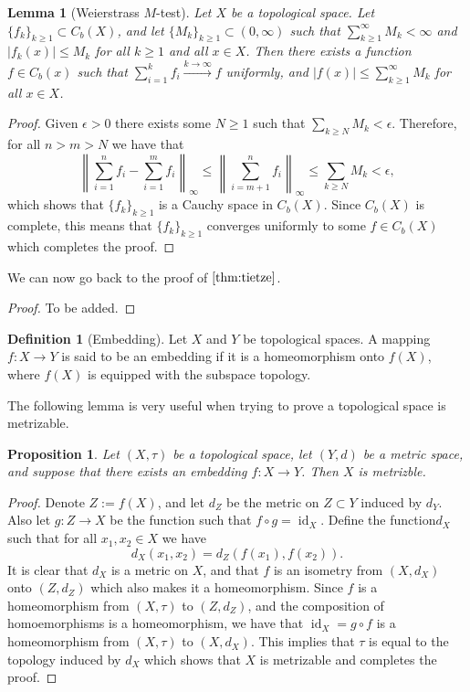 \documentclass[11pt,a4paper]{article}
\theoremstyle{definition}
\newtheorem{definition}{Definition}[section]
\theoremstyle{plain}
\newtheorem{proposition}[theorem]{Proposition}
\newtheorem{lemma}[theorem]{Lemma}
\DeclareMathOperator{\id}{id}
\newcommand{\abs}[1]{\left\lvert #1\right\rvert}
\newcommand{\norm}[1]{\left\lVert #1\right\rVert}
\begin{document}
  \begin{lemma}[Weierstrass $M$-test]\label{lem:m-test}
    Let $X$ be a topological space. Let $\{f_k\}_{k \geq 1} \subset C_b(X)$,
    and let $\{M_k\}_{k \geq 1} \subset (0,\infty)$ such that
    $\sum_{k \geq 1}^{\infty} M_k < \infty$ and
    $\abs{f_k(x)} \le M_k$ for all $k \geq 1$ and all $x \in X$.
    Then there exists a function $f \in C_b(x)$ such that
    $\sum_{i=1}^{k} f_i \xrightarrow{k \to \infty} f$ uniformly, and
    $\abs{f(x)} \le \sum_{k \geq 1}^{\infty} M_k$ for all $x \in X$.
  \end{lemma}
  \begin{proof}
    Given $\epsilon > 0$ there exists some $N \geq 1$ such that
    $\sum_{k \geq N} M_k < \epsilon$. Therefore, for all $n > m > N$
    we have that
    \[
      \norm{\sum_{i=1}^{n} f_i - \sum_{i=1}^{m} f_i}_{\infty} \le
      \norm{\sum_{i=m+1}^{n} f_i}_{\infty} \le
      \sum_{k \geq N} M_k <
      \epsilon,
    \]
    which shows that $\{f_k\}_{k \geq 1}$ is a Cauchy space in $C_b(X)$.
    Since $C_b(X)$ is complete, this means that $\{f_k\}_{k \geq 1}$ converges
    uniformly to some $f \in C_b(X)$ which completes the proof.
  \end{proof}
  
  We can now go back to the proof of $\autoref{thm:tietze}$.
  \begin{proof}
    To be added.
  \end{proof}

  \begin{definition}[Embedding]
      Let $X$ and $Y$ be topological spaces. A mapping $f \colon X \to Y$
      is said to be an embedding if it is a homeomorphism onto $f(X)$,
      where $f(X)$ is equipped with the subspace topology.
  \end{definition}

  The following lemma is very useful when trying to prove a topological space
  is metrizable.

  \begin{proposition}
    Let $(X, \tau)$ be a topological space, let $(Y, d)$ be a metric space,
    and suppose that there exists an embedding $f \colon X \to Y$.
    Then $X$ is metrizble.
  \end{proposition}
  \begin{proof}
    Denote $Z := f(X)$, and let $d_Z$ be the metric on $Z \subset Y$ induced
    by $d_Y$. Also let $g \colon Z \to X$ be the function such that
    $f \circ g = \id_X$. Define the function$d_X$ such that for all 
    $x_1, x_2 \in X$ we have
    \[
      d_X(x_1, x_2) = d_Z(f(x_1), f(x_2)).
    \]
    It is clear that $d_X$ is a metric on $X$, and that $f$ is an isometry
    from $(X,d_X)$ onto $(Z,d_Z)$ which also makes it a homeomorphism.
    Since $f$ is a homeomorphism from $(X, \tau)$ to $(Z, d_Z)$, and
    the composition of homoemorphisms is a homeomorphism, we have that
    $\id_X = g \circ f$ is a homeomorphism from $(X, \tau)$ to $(X, d_X)$.
    This implies that $\tau$ is equal to the topology induced by $d_X$
    which shows that $X$ is metrizable and completes the proof.
  \end{proof}
\end{document}
